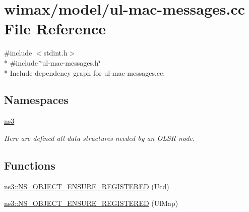 \hypertarget{ul-mac-messages_8cc}{}\section{wimax/model/ul-\/mac-\/messages.cc File Reference}
\label{ul-mac-messages_8cc}
{\ttfamily \#include $<$stdint.\+h$>$}\\*
{\ttfamily \#include \char`\"{}ul-\/mac-\/messages.\+h\char`\"{}}\\*
Include dependency graph for ul-\/mac-\/messages.cc\+:
\subsection*{Namespaces}
\begin{DoxyCompactItemize}
\item 
 \hyperlink{namespacens3}{ns3}
\begin{DoxyCompactList}\small\item\em Here are defined all data structures needed by an O\+L\+SR node. \end{DoxyCompactList}\end{DoxyCompactItemize}
\subsection*{Functions}
\begin{DoxyCompactItemize}
\item 
\hyperlink{namespacens3_a909183b500ff32c5db99ce222e171950}{ns3\+::\+N\+S\+\_\+\+O\+B\+J\+E\+C\+T\+\_\+\+E\+N\+S\+U\+R\+E\+\_\+\+R\+E\+G\+I\+S\+T\+E\+R\+ED} (Ucd)
\item 
\hyperlink{namespacens3_accbbbdd192eeb7cff5b067f49635b821}{ns3\+::\+N\+S\+\_\+\+O\+B\+J\+E\+C\+T\+\_\+\+E\+N\+S\+U\+R\+E\+\_\+\+R\+E\+G\+I\+S\+T\+E\+R\+ED} (Ul\+Map)
\end{DoxyCompactItemize}
